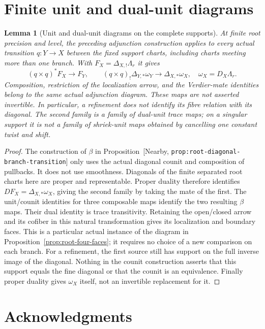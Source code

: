 \documentclass[11pt]{article}
\newtheorem{lemma}[proposition]{Lemma}
\theoremstyle{definition}
\theoremstyle{remark}
\newcommand{\mainref}[1]{\textnormal{[Nearby, \nolinkurl{#1}]}}
\begin{document}
\section{Finite unit and dual-unit diagrams}
\begin{lemma}[Unit and dual-unit diagrams on the complete supports]
\label{lem:root-unit-dual-unit-diagram}
At finite root precision and level, the preceding adjunction
construction applies to every actual transition $q:Y\to X$
between the fixed support charts, including charts meeting more
than one branch.  With $F_X=\Delta_{X,!}\Lambda_r$ it gives
\[
 (q\times q)^*F_X\longrightarrow F_Y,
 \qquad
 (q\times q)_!\Delta_{Y,*}\omega_Y
                  \longrightarrow\Delta_{X,*}\omega_X,
 \quad \omega_X=D_X\Lambda_r.
\]
Composition, restriction of the localization arrow, and the
Verdier-mate identities belong to the same actual adjunction
diagram.  These maps are not asserted invertible.  In particular,
a refinement does not identify its fibre relation with its diagonal.
The second family is a family of \emph{dual-unit} trace maps; on a
singular support it is not a family of shriek-unit maps obtained
by cancelling one constant twist and shift.
\end{lemma}
\begin{proof}
The construction of $\beta$ in
Proposition~\mainref{prop:root-diagonal-branch-transition} only uses the
actual diagonal counit and composition of pullbacks.  It does not
use smoothness.  Diagonals of the finite separated root charts here
are proper and representable.  Proper duality therefore identifies
$D F_X=\Delta_{X,*}\omega_X$, giving the second family by taking
the mate of the first.  The unit/counit identities for three
composable maps identify the two resulting $\beta$ maps.  Their
dual identity is trace transitivity.  Retaining the open/closed
arrow and its cofiber in this natural transformation gives its
localization and boundary faces.  This is a particular actual
instance of the diagram in Proposition~\ref{prop:root-four-faces};
it requires no choice of a new comparison on each branch.  For a
refinement, the first source still has support on the full inverse
image of the diagonal.  Nothing in the counit construction asserts
that this support equals the fine diagonal or that the counit is
an equivalence.  Finally proper duality gives $\omega_X$ itself,
not an invertible replacement for it.
\end{proof}

\section*{Acknowledgments}
\end{document}
